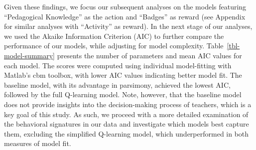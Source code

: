 \documentclass[
  number,
  preprint,
  3p,
  onecolumn]{elsarticle}
\begin{document}
Given these findings, we focus our subsequent analyses on the models
featuring ``Pedagogical Knowledge'' as the action and ``Badges'' as
reward (see Appendix for similar analyses with ``Activity'' as reward).
In the next stage of our analyses, we used the Akaike Information
Criterion (AIC) to further compare the performance of our models, while
adjusting for model complexity. Table~\ref{tbl-model-summary} presents
the number of parameters and mean AIC values for each model. The scores
were computed using individual model-fitting with Matlab's cbm toolbox,
with lower AIC values indicating better model fit. The baseline model,
with its advantage in parsimony, achieved the lowest AIC, followed by
the full Q-learning model. Note, however, that the baseline model does
not provide insights into the decision-making process of teachers, which
is a key goal of this study. As such, we proceed with a more detailed
examination of the behavioral signatures in our data and investigate
which models best capture them, excluding the simplified Q-learning
model, which underperformed in both measures of model fit.
\end{document}
